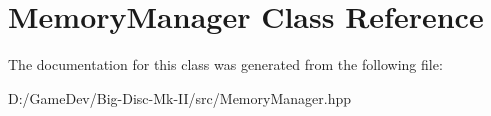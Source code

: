 \hypertarget{class_memory_manager}{}\section{Memory\+Manager Class Reference}
\label{class_memory_manager}


The documentation for this class was generated from the following file\+:\begin{DoxyCompactItemize}
\item 
D\+:/\+Game\+Dev/\+Big-\/\+Disc-\/\+Mk-\/\+I\+I/src/Memory\+Manager.\+hpp\end{DoxyCompactItemize}
